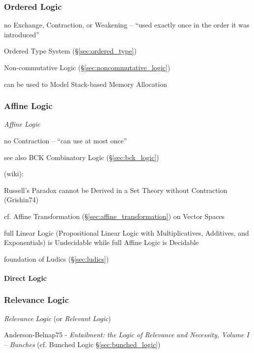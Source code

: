 \subsubsection{Ordered Logic}\label{sec:ordered_logic}\hfill

no Exchange, Contraction, or Weakening -- ``used exactly once in the
order it was introduced''

\fist Ordered Type System (\S\ref{sec:ordered_type})

\fist Non-commutative Logic (\S\ref{sec:noncommutative_logic})

can be used to Model Stack-based Memory Allocation



\subsubsection{Affine Logic}\label{sec:affine_logic}

\emph{Affine Logic}

no Contraction -- ``can use at most once''

\fist see also BCK Combinatory Logic (\S\ref{sec:bck_logic})

(wiki):

Russell's Paradox cannot be Derived in a Set Theory without
Contraction (Grishin74)

cf. Affine Transformation (\S\ref{sec:affine_transformation}) on
Vector Spaces

full Linear Logic (Propositional Linear Logic with Multiplicatives,
Additives, and Exponentials) is Undecidable while full Affine Logic is
Decidable

foundation of Ludics (\S\ref{sec:ludics})



\paragraph{Direct Logic}\label{sec:direct_logic}\hfill



\subsubsection{Relevance Logic}\label{sec:relevance_logic}

\emph{Relevance Logic} (or \emph{Relevant Logic})

Anderson-Belnap75 - \emph{Entailment: the Logic of Relevance and
  Necessity, Volume I} -- \emph{Bunches} (cf. Bunched Logic
\S\ref{sec:bunched_logic})

